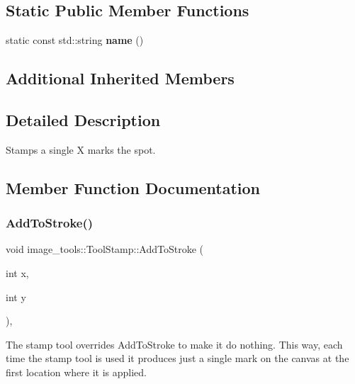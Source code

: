 \subsection*{Static Public Member Functions}
\begin{DoxyCompactItemize}
\item 
\mbox{\label{classimage__tools_1_1ToolStamp_a2c47a895c86e2aed7b869c66529aab6d}} 
static const std\+::string {\bfseries name} ()
\end{DoxyCompactItemize}
\subsection*{Additional Inherited Members}


\subsection{Detailed Description}
Stamps a single X marks the spot. 

\subsection{Member Function Documentation}
\mbox{\label{classimage__tools_1_1ToolStamp_a098a342f03717e2f909cda9515c85814}} 
\subsubsection{\texorpdfstring{Add\+To\+Stroke()}{AddToStroke()}}
{\footnotesize\ttfamily void image\+\_\+tools\+::\+Tool\+Stamp\+::\+Add\+To\+Stroke (\begin{DoxyParamCaption}\item[{int}]{x,  }\item[{int}]{y }\end{DoxyParamCaption})\hspace{0.3cm}{\ttfamily [override]}, {\ttfamily [virtual]}}

The stamp tool overrides Add\+To\+Stroke to make it do nothing. This way, each time the stamp tool is used it produces just a single mark on the canvas at the first location where it is applied. 

